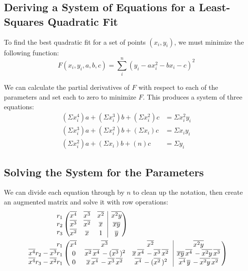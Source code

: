 \documentclass{article}
\newcommand{\ol}[1]{\overline{#1}\,} %
\begin{document}
\subsection{Deriving a System of Equations for a Least-Squares Quadratic Fit}

To find the best quadratic fit for a set of points $(x_i, y_i)$, we must minimize the following function:
\begin{equation}
F(x_i, y_i, a, b, c) = \sum_i^n(y_i-ax_i^2-bx_i-c)^2
\end{equation}

We can calculate the partial derivatives of $F$ with respect to each of the parameters and set each to zero to minimize $F$. This produces a system of three equations:
\begin{equation*}
\begin{aligned}
(\Sigma x_i^4)a + (\Sigma x_i^3)b + (\Sigma x_i^2)c &= \Sigma x_i^2y_i \\
(\Sigma x_i^3)a + (\Sigma x_i^2)b + (\Sigma x_i)c &= \Sigma x_iy_i \\
(\Sigma x_i^2)a + (\Sigma x_i)b + (n)c &= \Sigma y_i
\end{aligned}
\end{equation*}

\subsection{Solving the System for the Parameters}
We can divide each equation through by $n$ to clean up the notation, then create an augmented matrix and solve it with row operations:
\begin{equation*}
\begin{aligned}
\begin{array}{r@{}}
r_1 \\
r_2 \\
r_3
\end{array}
&\left(
\begin{array}{@{}ccc|c@{}}
\overline{x^4} & \overline{x^3} & \overline{x^2} & \overline{x^2y} \\
\overline{x^3} & \overline{x^2} & \overline{x} & \overline{xy} \\
\overline{x^2} & \overline{x} & 1 & \overline{y}
\end{array}
\right) \\
\begin{array}{r@{}}
r_1 \\
\overline{x^4}r_2 - \overline{x^3}r_1 \\
\overline{x^4}r_3 - \overline{x^2}r_1
\end{array}
&\left(
\begin{array}{@{}ccc|c@{}}
\ol{x^4} & \ol{x^3} & \ol{x^2} & \ol{x^2y} \\
0 & \ol{x^2}\ol{x^4} - (\ol{x^3})^2 & \ol{x}\ol{x^4} - \ol{x^3}\ol{x^2} & \ol{xy}\ol{x^4} - \ol{x^2y}\ol{x^3} \\
0 & \ol{x}\ol{x^4} - \ol{x^3}\ol{x^2} & \ol{x^4} - (\ol{x^2})^2 & \ol{x^4}\ol{y} - \ol{x^2y}\ol{x^2}
\end{array}
\right)
\end{aligned}
\end{equation*}
\end{document}
